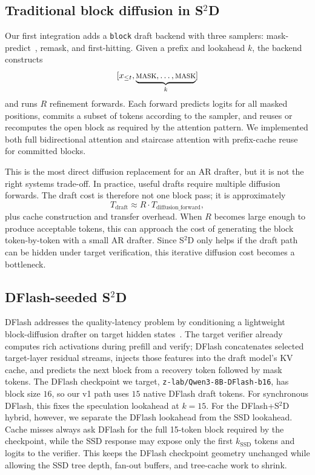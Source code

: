 \subsection{Traditional block diffusion in \texorpdfstring{S$^2$D}{S2D}}

Our first integration adds a \texttt{block} draft backend with three samplers:
mask-predict~\cite{ghazvininejad2019}, remask, and first-hitting. Given a
prefix and lookahead $k$, the backend constructs
\[
  [x_{\le t}, \underbrace{\textsc{mask},\ldots,\textsc{mask}}_{k}]
\]
and runs $R$ refinement forwards. Each forward predicts logits for all masked
positions, commits a subset of tokens according to the sampler, and reuses or
recomputes the open block as required by the attention pattern. We implemented
both full bidirectional attention and staircase attention with prefix-cache
reuse for committed blocks.

This is the most direct diffusion replacement for an AR drafter, but it is
not the right systems trade-off. In practice, useful drafts require multiple
diffusion forwards. The draft cost is therefore not one block pass; it is
approximately
\[
  T_{\mathrm{draft}} \approx R \cdot T_{\mathrm{diffusion\_forward}},
\]
plus cache construction and transfer overhead. When $R$ becomes large enough
to produce acceptable tokens, this can approach the cost of generating the
block token-by-token with a small AR drafter. Since S$^2$D only helps if the
draft path can be hidden under target verification, this iterative diffusion
cost becomes a bottleneck.

\subsection{DFlash-seeded \texorpdfstring{S$^2$D}{S2D}}

DFlash addresses the quality-latency problem by conditioning a lightweight
block-diffusion drafter on target hidden states~\cite{chen2026dflash}. The
target verifier already computes rich activations during prefill and verify;
DFlash concatenates selected target-layer residual streams, injects those
features into the draft model's KV cache, and predicts the next block from a
recovery token followed by mask tokens. The DFlash checkpoint we target,
\texttt{z-lab/Qwen3-8B-DFlash-b16}, has block size $16$, so our v1 path uses
$15$ native DFlash draft tokens. For synchronous DFlash, this fixes the
speculation lookahead at $k=15$. For the DFlash+S$^2$D hybrid, however, we
separate the DFlash lookahead from the SSD lookahead. Cache misses always ask
DFlash for the full 15-token block required by the checkpoint, while the SSD
response may expose only the first $k_{\mathrm{SSD}}$ tokens and logits to the
verifier. This keeps the DFlash checkpoint geometry unchanged while allowing
the SSD tree depth, fan-out buffers, and tree-cache work to shrink.

